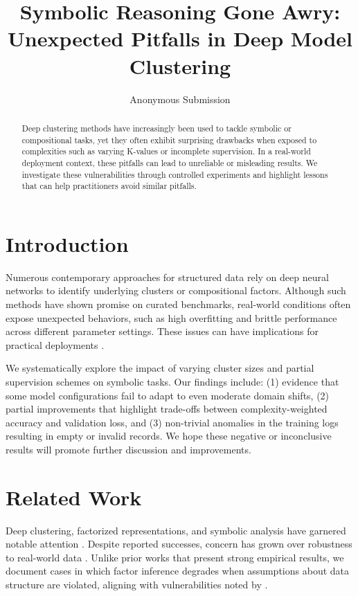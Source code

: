 \documentclass{article}
\title{Symbolic Reasoning Gone Awry: Unexpected Pitfalls in Deep Model Clustering}
\author{
    Anonymous Submission
}
\date{}
\begin{document}
\maketitle

\begin{abstract}
Deep clustering methods have increasingly been used to tackle symbolic or compositional tasks, yet they often exhibit surprising drawbacks when exposed to complexities such as varying K-values or incomplete supervision. In a real-world deployment context, these pitfalls can lead to unreliable or misleading results. We investigate these vulnerabilities through controlled experiments and highlight lessons that can help practitioners avoid similar pitfalls.
\end{abstract}

\section{Introduction}
Numerous contemporary approaches for structured data rely on deep neural networks to identify underlying clusters or compositional factors. Although such methods have shown promise on curated benchmarks, real-world conditions often expose unexpected behaviors, such as high overfitting and brittle performance across different parameter settings. These issues can have implications for practical deployments \citep{chen2020deep,gulrajani2021}.

We systematically explore the impact of varying cluster sizes and partial supervision schemes on symbolic tasks. Our findings include: (1) evidence that some model configurations fail to adapt to even moderate domain shifts, (2) partial improvements that highlight trade-offs between complexity-weighted accuracy and validation loss, and (3) non-trivial anomalies in the training logs resulting in empty or invalid records. We hope these negative or inconclusive results will promote further discussion and improvements.

\section{Related Work}
Deep clustering, factorized representations, and symbolic analysis have garnered notable attention \citep{jin2018deep,rezende2014stochastic,burgess2019monet}. Despite reported successes, concern has grown over robustness to real-world data \citep{locatello2019challenging}. Unlike prior works that present strong empirical results, we document cases in which factor inference degrades when assumptions about data structure are violated, aligning with vulnerabilities noted by \citet{wu2020unsupervised}.
\end{document}
